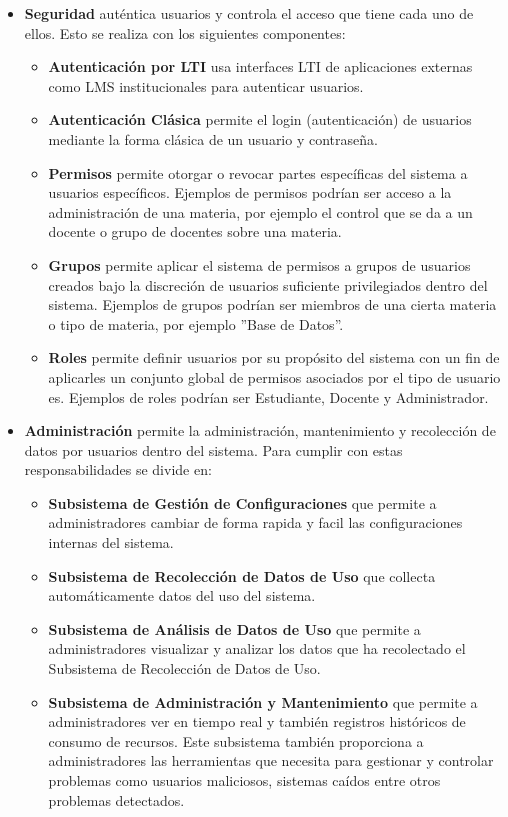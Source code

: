 \begin{itemize}
	\item \textbf{Seguridad} auténtica usuarios y controla el acceso que tiene cada uno de ellos. Esto se realiza con los siguientes componentes:
    \begin{itemize}
    	\item \textbf{Autenticación por LTI} usa interfaces LTI  de aplicaciones externas como LMS  institucionales para autenticar usuarios.
		\item \textbf{Autenticación Clásica} permite el login (autenticación) de usuarios mediante la forma clásica de un usuario y contraseña.
		\item \textbf{Permisos} permite otorgar o revocar partes específicas del sistema a usuarios específicos. Ejemplos de permisos podrían ser acceso a la administración de una materia, por ejemplo el control que se da a un docente o grupo de docentes sobre una materia.
		\item \textbf{Grupos} permite aplicar el sistema de permisos a grupos de usuarios creados bajo la discreción de usuarios suficiente privilegiados dentro del sistema. Ejemplos de grupos podrían ser miembros de una cierta materia o tipo de materia, por ejemplo ''Base de Datos''.
		\item \textbf{Roles} permite definir usuarios por su propósito del sistema con un fin de aplicarles un conjunto global de permisos asociados por el tipo de usuario es. Ejemplos de roles podrían ser Estudiante, Docente y Administrador.
    \end{itemize}
    \item \textbf{Administración} permite la administración, mantenimiento y recolección de datos por usuarios dentro del sistema. Para cumplir con estas responsabilidades se divide en:
    \begin{itemize}
    	\item \textbf{Subsistema de Gestión de Configuraciones} que permite a administradores cambiar de forma rapida y facil las configuraciones internas del sistema.
        \item \textbf{Subsistema de Recolección de Datos de Uso} que collecta automáticamente datos del uso del sistema.
        \item \textbf{Subsistema de Análisis de Datos de Uso} que permite a administradores visualizar y analizar los datos que ha recolectado el Subsistema de Recolección de Datos de Uso.
        \item \textbf{Subsistema de Administración y Mantenimiento} que permite a administradores ver en tiempo real y también registros históricos de consumo de recursos. Este subsistema también proporciona a administradores las herramientas que necesita para gestionar y controlar problemas como usuarios maliciosos, sistemas caídos entre otros problemas detectados.

\end{itemize}
\end{itemize}
